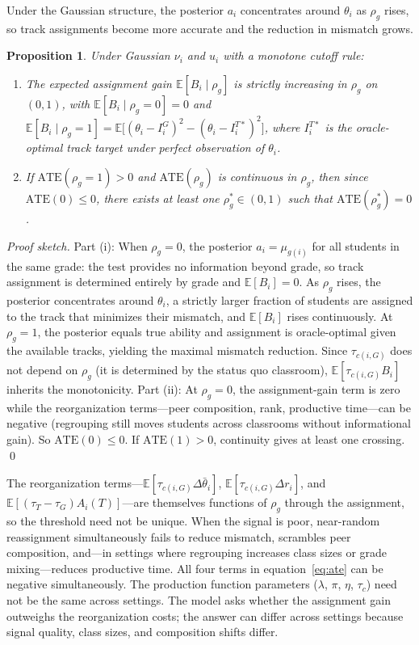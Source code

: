 \documentclass[11pt]{article}
\newtheorem{proposition}{Proposition}
\newcommand{\E}{\mathbb{E}}
\begin{document}
Under the Gaussian structure, the posterior $a_i$ concentrates around $\theta_i$ as $\rho_g$ rises, so track assignments become more accurate and the reduction in mismatch grows.

\begin{proposition}
\label{prop:threshold}
Under Gaussian $\nu_i$ and $u_i$ with a monotone cutoff rule:
\begin{enumerate}
\item[(i)] The expected assignment gain $\E[B_i \mid \rho_g]$ is strictly increasing in $\rho_g$ on $(0,1)$, with $\E[B_i \mid \rho_g = 0] = 0$ and $\E[B_i \mid \rho_g = 1] = \E\!\big[(\theta_i - I_i^G)^2 - (\theta_i - I_i^{T*})^2\big]$, where $I_i^{T*}$ is the oracle-optimal track target under perfect observation of $\theta_i$.
\item[(ii)] If $\text{ATE}(\rho_g = 1) > 0$ and $\text{ATE}(\rho_g)$ is continuous in $\rho_g$, then since $\text{ATE}(0) \leq 0$, there exists at least one $\rho^*_g \in (0,1)$ such that $\text{ATE}(\rho^*_g) = 0$.
\end{enumerate}
\end{proposition}

\noindent \emph{Proof sketch.} Part (i): When $\rho_g = 0$, the posterior $a_i = \mu_{g(i)}$ for all students in the same grade: the test provides no information beyond grade, so track assignment is determined entirely by grade and $\E[B_i] = 0$. As $\rho_g$ rises, the posterior concentrates around $\theta_i$, a strictly larger fraction of students are assigned to the track that minimizes their mismatch, and $\E[B_i]$ rises continuously. At $\rho_g = 1$, the posterior equals true ability and assignment is oracle-optimal given the available tracks, yielding the maximal mismatch reduction. Since $\tau_{c(i,G)}$ does not depend on $\rho_g$ (it is determined by the status quo classroom), $\E[\tau_{c(i,G)} B_i]$ inherits the monotonicity. Part (ii): At $\rho_g = 0$, the assignment-gain term is zero while the reorganization terms---peer composition, rank, productive time---can be negative (regrouping still moves students across classrooms without informational gain). So $\text{ATE}(0) \leq 0$. If $\text{ATE}(1) > 0$, continuity gives at least one crossing. \qed

The reorganization terms---$\E[\tau_{c(i,G)}\Delta\bar{\theta}_i]$, $\E[\tau_{c(i,G)}\Delta r_i]$, and $\E[(\tau_T - \tau_G)A_i(T)]$---are themselves functions of $\rho_g$ through the assignment, so the threshold need not be unique. When the signal is poor, near-random reassignment simultaneously fails to reduce mismatch, scrambles peer composition, and---in settings where regrouping increases class sizes or grade mixing---reduces productive time. All four terms in equation~\eqref{eq:ate} can be negative simultaneously. The production function parameters ($\lambda$, $\pi$, $\eta$, $\tau_c$) need not be the same across settings. The model asks whether the assignment gain outweighs the reorganization costs; the answer can differ across settings because signal quality, class sizes, and composition shifts differ.
\end{document}
